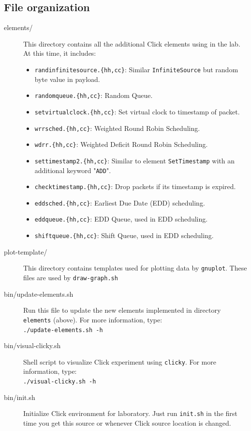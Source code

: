 \documentclass[a4paper]{article}
\begin{document}
    \subsection{File organization}
      \begin{description}
      	\item[elements/] This directory contains all the additional Click elements using in the lab. At this time, it includes:
      	\begin{itemize}
      		\item \texttt{randinfinitesource.\{hh,cc\}}: Similar \texttt{InfiniteSource} but random byte value in payload.
      		\item \texttt{randomqueue.\{hh,cc\}}: Random Queue.
      		\item \texttt{setvirtualclock.\{hh,cc\}}: Set virtual clock to timestamp of packet.
      		\item \texttt{wrrsched.\{hh,cc\}}: Weighted Round Robin Scheduling.
      		\item \texttt{wdrr.\{hh,cc\}}: Weighted Deficit Round Robin Scheduling.
      		\item \texttt{settimestamp2.\{hh,cc\}}: Similar to element \texttt{SetTimestamp} with an additional keyword "\texttt{ADD}".
      		\item \texttt{checktimestamp.\{hh,cc\}}: Drop packets if its timestamp is expired.
      		\item \texttt{eddsched.\{hh,cc\}}: Earliest Due Date (EDD) scheduling.
      		\item \texttt{eddqueue.\{hh,cc\}}: EDD Queue, used in EDD scheduling.
      		\item \texttt{shiftqueue.\{hh,cc\}}: Shift Queue, used in EDD scheduling.
    		\end{itemize}
      	\item[plot-template/] This directory contains templates used for plotting data by \texttt{gnuplot}. These files are used by \texttt{draw-graph.sh}
      	\item[bin/update-elements.sh] Run this file to update the new elements implemented in directory \texttt{elements} (above). For more information, type: \\
      	\texttt{./update-elements.sh -h}
      	\item[bin/visual-clicky.sh]Shell script to visualize Click experiment using \texttt{clicky}. For more information, type: \\ 
      	\texttt{./visual-clicky.sh -h}
      	\item[bin/init.sh]Initialize Click environment for laboratory. Just run \texttt{init.sh} in the first time you get this source or whenever Click source location is changed.

\end{description}
\end{document}
